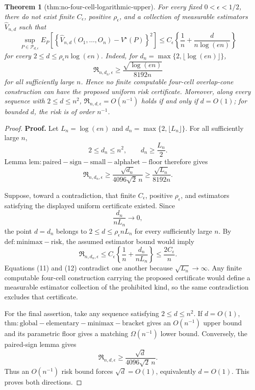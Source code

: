\documentclass{article}
\newtheorem{theorem}{Theorem}
\begin{document}
\begin{theorem}[thm:no-four-cell-logarithmic-upper]\label{thm:no-four-cell-logarithmic-upper}
For every fixed \(0<\epsilon<1/2\), there do not exist finite \(C_\epsilon\), positive \(\rho_\epsilon\), and a collection of measurable estimators \(\widehat V_{n,d}\) such that
\[
 \sup_{P\in\mathcal P_{d,\epsilon}}
 E_P\!\left[
  \left\{\widehat V_{n,d}(O_1,\ldots,O_n)-V^\star(P)\right\}^2
 \right]
 \le C_\epsilon\left\{\frac1n+\frac d{n\log(en)}\right\}
\]
for every \(2\le d\le\rho_\epsilon n\log(en)\).  Indeed, for \(d_n=\max\{2,\lfloor\log(en)\rfloor\}\),
\[
 \mathfrak R_{n,d_n,\epsilon}
 \ge \frac{\sqrt{\log(en)}}{8192n}
\]
for all sufficiently large \(n\).  Hence no finite computable four-cell overlap-cone construction can have the proposed uniform risk certificate.  Moreover, along every sequence with \(2\le d\le n^2\), \(\mathfrak R_{n,d,\epsilon}=O(n^{-1})\) holds if and only if \(d=O(1)\); for bounded \(d\), the risk is of order \(n^{-1}\).
\end{theorem}
\begin{proof}
\textbf{Proof.}
Let \(L_n=\log(en)\) and \(d_n=\max\{2,\lfloor L_n\rfloor\}\).  For all sufficiently large \(n\),
\[
 2\le d_n\le n^2,
 \qquad
 d_n\ge\frac{L_n}{2}.
\]
Lemma \(\mathrm{lem:paired-sign-small-alphabet-floor}\) therefore gives
\[
 \mathfrak R_{n,d_n,\epsilon}
 \ge\frac{\sqrt{d_n}}{4096\sqrt2\,n}
 \ge\frac{\sqrt{L_n}}{8192n}.
\tag{11}
\]

Suppose, toward a contradiction, that finite \(C_\epsilon\), positive \(\rho_\epsilon\), and estimators satisfying the displayed uniform certificate existed.  Since
\[
 \frac{d_n}{nL_n}\longrightarrow0,
\]
the point \(d=d_n\) belongs to \(2\le d\le\rho_\epsilon nL_n\) for every sufficiently large \(n\).  By \(\mathrm{def:minimax-risk}\), the assumed estimator bound would imply
\[
 \mathfrak R_{n,d_n,\epsilon}
 \le C_\epsilon\left\{\frac1n+\frac{d_n}{nL_n}\right\}
 \le\frac{2C_\epsilon}{n}.
\tag{12}
\]
Equations (11) and (12) contradict one another because \(\sqrt{L_n}\to\infty\).  Any finite computable four-cell construction carrying the proposed certificate would define a measurable estimator collection of the prohibited kind, so the same contradiction excludes that certificate.

For the final assertion, take any sequence satisfying \(2\le d\le n^2\).  If \(d=O(1)\), \(\mathrm{thm:global-elementary-minimax-bracket}\) gives an \(O(n^{-1})\) upper bound and its parametric floor gives a matching \(\Omega(n^{-1})\) lower bound.  Conversely, the paired-sign lemma gives
\[
 \mathfrak R_{n,d,\epsilon}
 \ge\frac{\sqrt d}{4096\sqrt2\,n}.
\]
Thus an \(O(n^{-1})\) risk bound forces \(\sqrt d=O(1)\), equivalently \(d=O(1)\).  This proves both directions.
\end{proof}
\end{document}
